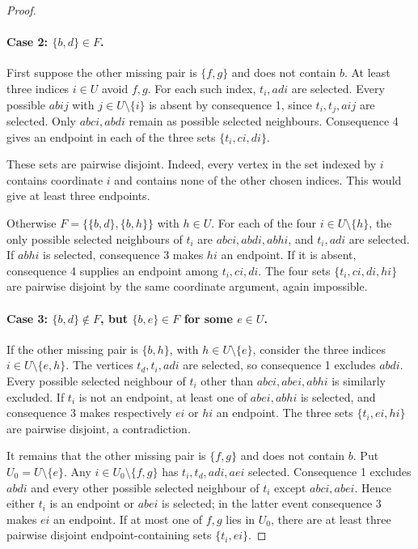 \documentclass[11pt,a4paper]{article}
\theoremstyle{definition}
\theoremstyle{remark}
\begin{document}
\begin{proof}
\paragraph{Case 2: $\{b,d\}\in F$.}
First suppose the other missing pair is $\{f,g\}$ and does not contain $b$. At least three indices $i\in U$ avoid $f,g$. For each such index, $t_i,adi$ are selected. Every possible $abij$ with $j\in U\setminus\{i\}$ is absent by consequence 1, since $t_i,t_j,aij$ are selected. Only $abci,abdi$ remain as possible selected neighbours. Consequence 4 gives an endpoint in each of the three sets $\{t_i,ci,di\}$.

These sets are pairwise disjoint. Indeed, every vertex in the set indexed by $i$ contains coordinate $i$ and contains none of the other chosen indices. This would give at least three endpoints.

Otherwise $F=\{\{b,d\},\{b,h\}\}$ with $h\in U$. For each of the four $i\in U\setminus\{h\}$, the only possible selected neighbours of $t_i$ are $abci,abdi,abhi$, and $t_i,adi$ are selected. If $abhi$ is selected, consequence 3 makes $hi$ an endpoint. If it is absent, consequence 4 supplies an endpoint among $t_i,ci,di$. The four sets $\{t_i,ci,di,hi\}$ are pairwise disjoint by the same coordinate argument, again impossible.

\paragraph{Case 3: $\{b,d\}\notin F$, but $\{b,e\}\in F$ for some $e\in U$.}
If the other missing pair is $\{b,h\}$, with $h\in U\setminus\{e\}$, consider the three indices $i\in U\setminus\{e,h\}$. The vertices $t_d,t_i,adi$ are selected, so consequence 1 excludes $abdi$. Every possible selected neighbour of $t_i$ other than $abci,abei,abhi$ is similarly excluded. If $t_i$ is not an endpoint, at least one of $abei,abhi$ is selected, and consequence 3 makes respectively $ei$ or $hi$ an endpoint. The three sets $\{t_i,ei,hi\}$ are pairwise disjoint, a contradiction.

It remains that the other missing pair is $\{f,g\}$ and does not contain $b$. Put $U_0=U\setminus\{e\}$. Any $i\in U_0\setminus\{f,g\}$ has $t_i,t_d,adi,aei$ selected. Consequence 1 excludes $abdi$ and every other possible selected neighbour of $t_i$ except $abci,abei$. Hence either $t_i$ is an endpoint or $abei$ is selected; in the latter event consequence 3 makes $ei$ an endpoint. If at most one of $f,g$ lies in $U_0$, there are at least three pairwise disjoint endpoint-containing sets $\{t_i,ei\}$.


\end{proof}
\end{document}
